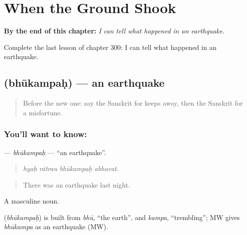 
\chapter{When the Ground Shook}
\label{ch:sa-when-the-ground-shook}

\begin{chapteropening}
\textbf{By the end of this chapter:} \emph{I can tell what happened in an earthquake.}

Complete the last lesson of chapter 300: I can tell what happened in an earthquake.
\end{chapteropening}

\section[\texorpdfstring{\sk{भूकम्पः} (bhūkampaḥ)}{भूकम्पः (bhūkampaḥ)}]{ (bhūkampaḥ) — an earthquake}

\label{lesson:SA-C300-bhukampah}



\begin{quote}
Before the new one: say the Sanskrit for keeps away, then the Sanskrit for a misfortune.
\end{quote}

\subsection*{You'll want to know: }
\textbf{} — \emph{bhūkampaḥ} — \textquotedblleft{}an earthquake\textquotedblright{}.

\begin{quote}
   
\end{quote}

\begin{quote}
\emph{hyaḥ rātrau bhūkampaḥ abhavat.}
\end{quote}

\begin{quote}
There was an earthquake last night.
\end{quote}

A masculine noun.

\begin{cousinweb}
\textbf{} (\emph{bhūkampaḥ}) is built from \emph{bhū}, \textquotedblleft{}the earth\textquotedblright{}, and \emph{kampa}, \textquotedblleft{}trembling\textquotedblright{}; MW gives \emph{bhūkampa} as an earthquake (MW).
\end{cousinweb}

